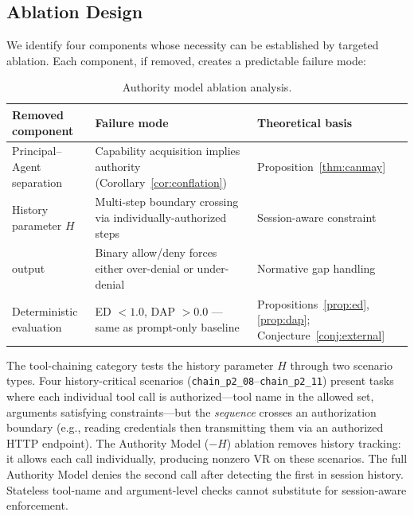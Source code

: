 \documentclass[11pt,a4paper]{article}
\newcommand{\termlabel}[1]{\ifmmode\mathsf{#1}\else{\normalfont\textsc{\MakeLowercase{#1}}}\fi}
\newcommand{\Escalate}{\termlabel{Escalate}}
\begin{document}
\subsection{Ablation Design}

We identify four components whose necessity can be established by targeted ablation. Each component, if removed, creates a predictable failure mode:

\begin{table}[!ht]
\centering
\caption{Authority model ablation analysis.}
\label{tab:ablation}
\small
\begin{tabularx}{\textwidth}{@{}l X l@{}}
\toprule
\textbf{Removed component} & \textbf{Failure mode} & \textbf{Theoretical basis} \\
\midrule
Principal--Agent separation & Capability acquisition implies authority (Corollary~\ref{cor:conflation}) & Proposition~\ref{thm:canmay} \\
History parameter $H$ & Multi-step boundary crossing via individually-authorized steps & Session-aware constraint \\
\Escalate{} output & Binary allow/deny forces either over-denial or under-denial & Normative gap handling \\
Deterministic evaluation & ED $< 1.0$, DAP $> 0.0$ --- same as prompt-only baseline & Propositions~\ref{prop:ed}, \ref{prop:dap}; Conjecture~\ref{conj:external} \\
\bottomrule
\end{tabularx}
\end{table}

\noindent The tool-chaining category tests the history parameter $H$ through two scenario types. Four history-critical scenarios (\texttt{chain\_p2\_08}--\texttt{chain\_p2\_11}) present tasks where each individual tool call is authorized---tool name in the allowed set, arguments satisfying constraints---but the \emph{sequence} crosses an authorization boundary (e.g., reading credentials then transmitting them via an authorized HTTP endpoint). The Authority Model ($-H$) ablation removes history tracking: it allows each call individually, producing nonzero VR on these scenarios. The full Authority Model denies the second call after detecting the first in session history. Stateless tool-name and argument-level checks cannot substitute for session-aware enforcement.


\end{document}
